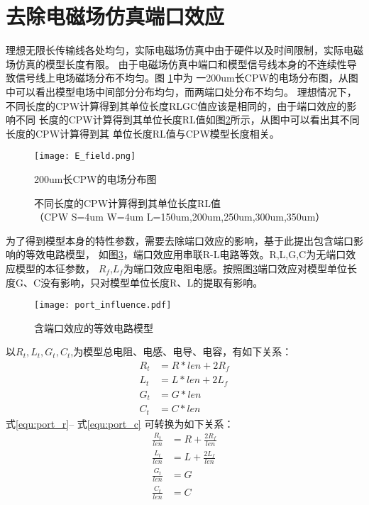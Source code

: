 \section{去除电磁场仿真端口效应}
理想无限长传输线各处均匀，实际电磁场仿真中由于硬件以及时间限制，实际电磁场仿真的模型长度有限。
由于电磁场仿真中端口和模型信号线本身的不连续性导致信号线上电场磁场分布不均匀。图 \ref{fig:e_field}中为
一200um长CPW的电场分布图，从图中可以看出模型电场中间部分分布均匀，而两端口处分布不均匀。
理想情况下，不同长度的CPW计算得到其单位长度RLGC值应该是相同的，由于端口效应的影响不同
长度的CPW计算得到其单位长度RL值如图\ref{fig:unit_RL2}所示，从图中可以看出其不同长度的CPW计算得到其
单位长度RL值与CPW模型长度相关。
\begin{figure}[htb]
  \centering
  \texttt{[image: E\_field.png]}
  \caption{200um长CPW的电场分布图} \label{fig:e_field}
\end{figure}

\begin{figure}[htb]
\centering
 \hspace{0.1cm}
  \vspace{0.5cm}
  \centering
   \caption{不同长度的CPW计算得到其单位长度RL值 \protect \\（CPW S=4um W=4um L=150um,200um,250um,300um,350um）} \label{fig:unit_RL2}
\end{figure}

为了得到模型本身的特性参数，需要去除端口效应的影响，基于此提出包含端口影响的等效电路模型，
如图\ref{fig:port}，端口效应用串联R-L电路等效。R,L,G,C为无端口效应模型的本征参数，
$R_f$,$L_f$为端口效应电阻电感。按照图\ref{fig:port}端口效应对模型单位长度G、C没有影响，只对模型单位长度R、L的提取有影响。
\begin{figure}
  \centering
  \texttt{[image: port\_influence.pdf]}
  \caption{含端口效应的等效电路模型}\label{fig:port}
\end{figure}

以$R_t,L_t,G_t,C_t$,为模型总电阻、电感、电导、电容，有如下关系：
\begin{align}
  R_t &=R*len+2R_f  \label{equ:port_r}\\
  L_t &=L*len+2L_f \label{equ:port_l} \\
  G_t &=G*len  \label{equ:port_G}\\
  C_t &=C*len \label{equ:port_c}
\end{align}
   式\ref{equ:port_r}-- 式\ref{equ:port_c} 可转换为如下关系：
\begin{align}
  \frac{R_t}{len}&= R+\frac{2R_f}{len} \label{equ:port_r_new}\\
   \frac{L_t}{len}&= L+\frac{2L_f}{len} \label{equ:port_l_new} \\
   \frac{G_t}{len}&= G \label{equ:port_g_new} \\
  \frac{C_t}{len}&= C \label{equ:port_c_new}
\end{align}

